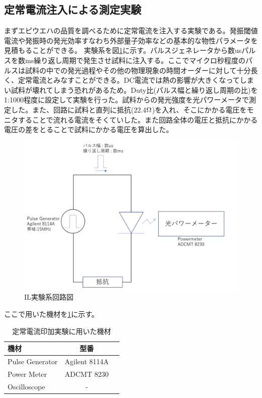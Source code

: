 \subsection{定常電流注入による測定実験}%
まずエピウエハの品質を調べるために定常電流を注入する実験である。発振閾値電流や発振時の発光効率すなわち外部量子効率などの基本的な物性パラメータを見積もることができる。
実験系を図\ref{fig:fig_2_2_IL_setup}に示す。パルスジェネレータから数usパルスを数ms繰り返し周期で発生させ試料に注入する。ここでマイクロ秒程度のパルスは試料の中での発光過程やその他の物理現象の時間オーダーに対して十分長く、定常電流とみなすことができる。DC電流では熱の影響が大きくなってしまい試料が壊れてしまう恐れがあるため。Duty比(パルス幅と繰り返し周期の比)を1:1000程度に設定して実験を行った。試料からの発光強度を光パワーメータで測定した。また、回路に試料と直列に抵抗(22.4$\rm{\Omega}$)を入れ、そこにかかる電圧をモニタすることで流れる電流をそくていした。また回路全体の電圧と抵抗にかかる電圧の差をとることで試料にかかる電圧を算出した。
\begin{figure}[htbp]
	\includegraphics[width=15cm]{figure/fig_2_2_IL_setup.png}
	\caption{IL実験系回路図}
	\label{fig:fig_2_2_IL_setup}
\end{figure}
\clearpage
ここで用いた機材を\ref{table:table_2_2_IL_setup}に示す。
\begin{table}[hbtp]
  \caption{定常電流印加実験に用いた機材}
  \label{table:table_2_2_IL_setup}
  \centering
  \begin{tabular}{lcr}
    \hline
    機材  & 型番     \\
    \hline \hline
    Pulse Generator  & Agilent 8114A   \\
    Power Meter  &  ADCMT 8230    \\
    Oscilloscope  &  -  \\
       \hline
  \end{tabular}
\end{table}
 \clearpage
